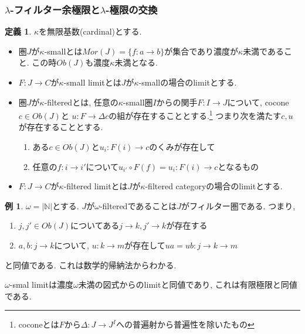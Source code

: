 \documentclass[dvipdfmx,a4paper,11pt]{article}
\newcommand{\N}{\mathbb{N}}
\theoremstyle{definition}
\newtheorem{dfn}[thm]{定義}
\newtheorem{exa}[thm]{例}
\newcommand{\xr}[1]{\textcolor{red}{#1}}
\begin{document}
\subsubsection{$\lambda$-フィルター余極限と$\lambda$-極限の交換}
 \begin{tcolorbox}
 [colback = white, colframe = green!35!black, fonttitle = \bfseries,breakable = true]
 \begin{dfn}\cite{Sha1}
 $\kappa$を無限基数(cardinal)とする.
 \begin{itemize}
 \item 圏$J$が$\kappa$-smallとは$Mor(J) =\{f : a \to b \}$が集合であり濃度が$\kappa$未満であること. この時$Ob(J)$も濃度$\kappa$未満となる.
 \item $F: J\to C$が$\kappa$-small limitとは$J$が$\kappa$-smallの場合のlimitとする.
 \item 圏$J$が$\kappa$-filteredとは, 
  任意の$\kappa$-small圏$I$からの関手$F : I \to J$について, cocone $c \in Ob(J)$と $u: F \to \Delta c$の組が存在することとする.\footnote{coconeとは$F$から$\Delta : J \to J^{I}$への普遍射から普遍性を除いたもの}
つまり次を満たす$c,u$が存在することとする. 
 \begin{enumerate}
 \item ある$c \in Ob(J)$と$u_{i} : F(i) \to c$のくみが存在して
 \item 任意の$f : i \to i'$について$ u_{i'}\circ F(f) = u_{i} : F(i) \to c$となるもの
 \end{enumerate}
\item $F: J\to C$が$\kappa$-filtered limitとは$J$が$\kappa$-filtered categoryの場合のlimitとする.
 \end{itemize}
 \end{dfn}
  \end{tcolorbox}

\begin{exa}
$\omega = |\N|$とする.
$J$が$\omega$-filteredであることは$J$がフィルター圏である. つまり, 
\begin{enumerate}
\item $j, j' \in Ob(J)$についてある$j \to k, j' \to k$が存在する
\item $a, b: j \to k$について, $u: k \to m$が存在して$ua = ub : j \to k \to m$
\end{enumerate}
と同値である.
これは数学的帰納法からわかる.

$\omega$-smal limitは濃度$\omega$未満の図式からのlimitと同値であり, これは有限極限と同値である. 

\end{exa}
\end{document}
